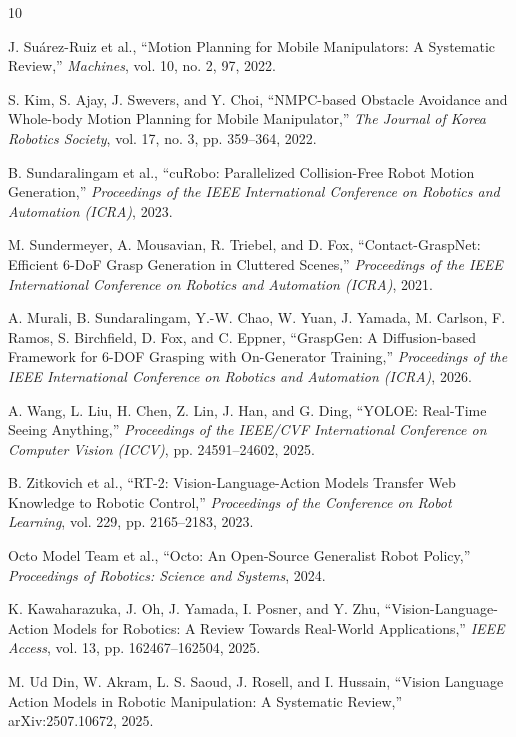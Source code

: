 \documentclass[12pt,a4paper]{article}
\begin{document}
\begin{thebibliography}{10}
\setlength{\itemsep}{4pt}

 J. Su\'arez-Ruiz et al., ``Motion Planning for Mobile Manipulators: A Systematic Review,''
\textit{Machines}, vol. 10, no. 2, 97, 2022.

 S. Kim, S. Ajay, J. Swevers, and Y. Choi, ``NMPC-based Obstacle Avoidance and Whole-body
Motion Planning for Mobile Manipulator,'' \textit{The Journal of Korea Robotics Society}, vol. 17, no. 3,
pp. 359--364, 2022.

 B. Sundaralingam et al., ``cuRobo: Parallelized Collision-Free Robot Motion Generation,''
\textit{Proceedings of the IEEE International Conference on Robotics and Automation (ICRA)}, 2023.

 M. Sundermeyer, A. Mousavian, R. Triebel, and D. Fox, ``Contact-GraspNet: Efficient 6-DoF
Grasp Generation in Cluttered Scenes,'' \textit{Proceedings of the IEEE International Conference on
Robotics and Automation (ICRA)}, 2021.

 A. Murali, B. Sundaralingam, Y.-W. Chao, W. Yuan, J. Yamada, M. Carlson, F. Ramos, S.
Birchfield, D. Fox, and C. Eppner, ``GraspGen: A Diffusion-based Framework for 6-DOF Grasping
with On-Generator Training,'' \textit{Proceedings of the IEEE International Conference on Robotics and
Automation (ICRA)}, 2026.

 A. Wang, L. Liu, H. Chen, Z. Lin, J. Han, and G. Ding, ``YOLOE: Real-Time Seeing Anything,''
\textit{Proceedings of the IEEE/CVF International Conference on Computer Vision (ICCV)}, pp.
24591--24602, 2025.

 B. Zitkovich et al., ``RT-2: Vision-Language-Action Models Transfer Web Knowledge to Robotic
Control,'' \textit{Proceedings of the Conference on Robot Learning}, vol. 229, pp. 2165--2183, 2023.

 Octo Model Team et al., ``Octo: An Open-Source Generalist Robot Policy,'' \textit{Proceedings of
Robotics: Science and Systems}, 2024.

 K. Kawaharazuka, J. Oh, J. Yamada, I. Posner, and Y. Zhu, ``Vision-Language-Action Models for
Robotics: A Review Towards Real-World Applications,'' \textit{IEEE Access}, vol. 13, pp. 162467--162504,
2025.

 M. Ud Din, W. Akram, L. S. Saoud, J. Rosell, and I. Hussain, ``Vision Language Action Models
in Robotic Manipulation: A Systematic Review,'' arXiv:2507.10672, 2025.

\end{thebibliography}
\end{document}
